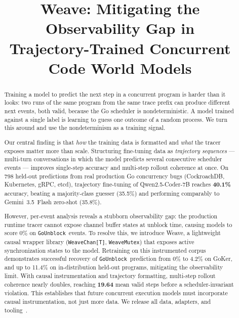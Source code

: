 \documentclass[10pt,conference]{IEEEtran}
\newcommand{\eunblock}{\texttt{GoUnblock}}
\begin{document}
\title{Weave: Mitigating the Observability Gap in\\
Trajectory-Trained Concurrent Code World Models}

\author{
}

\maketitle

\begin{abstract}
Training a model to predict the next step in a concurrent program is
harder than it looks: two runs of the same program from the same trace
prefix can produce different next events, both valid, because the Go
scheduler is nondeterministic.
A model trained against a single label is learning to guess one outcome
of a random process. We turn this around and use the nondeterminism as a training signal.

Our central finding is that \emph{how} the training data is formatted
and \emph{what} the tracer exposes matter more than scale.
Structuring fine-tuning data as \emph{trajectory sequences} —
multi-turn conversations in which the model predicts several
consecutive scheduler events — improves single-step accuracy and multi-step rollout coherence at once.
On 798 held-out predictions from real production Go concurrency bugs
(CockroachDB, Kubernetes, gRPC, etcd), trajectory fine-tuning of Qwen2.5-Coder-7B
reaches \textbf{40.1\%} accuracy, beating a majority-class guesser (35.5\%)
and performing comparably to Gemini~3.5~Flash zero-shot (35.8\%).

However, per-event analysis reveals a stubborn observability gap:
the production runtime tracer cannot expose channel buffer states at unblock time,
causing models to score 0\% on \eunblock\ events.
To resolve this, we introduce Weave, a lightweight causal wrapper library
(\texttt{WeaveChan[T]}, \texttt{WeaveMutex}) that exposes active synchronization states to the model.
Retraining on this instrumented corpus demonstrates successful recovery of \eunblock\
prediction from 0\% to 4.2\% on GoKer, and up to 11.4\% on in-distribution held-out programs, mitigating the observability limit.
With causal instrumentation and trajectory formatting, multi-step rollout coherence nearly doubles,
reaching \textbf{19.64} mean valid steps before a scheduler-invariant violation.
This establishes that future concurrent execution models must incorporate causal instrumentation, not just more data.
We release all data, adapters, and tooling~\cite{anon-artifacts}.
\end{abstract}
\end{document}
